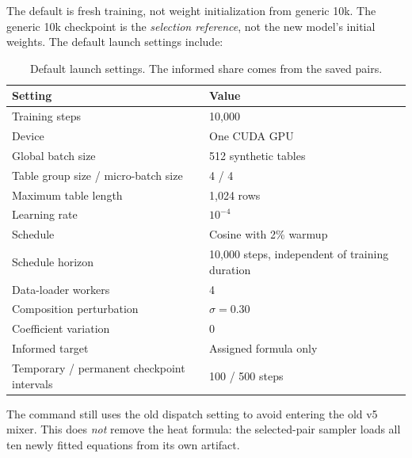 \documentclass[11pt]{article}
\newcommand{\code}[1]{\texttt{\detokenize{#1}}}
\begin{document}
The default is fresh training, not weight initialization from generic 10k.
The generic 10k checkpoint is the \emph{selection reference}, not the new model's
initial weights. The default launch settings include:
\begin{table}[htbp]
\centering
\begin{tabular}{ll}
\toprule
Setting & Value \\
\midrule
Training steps & 10,000 \\
Device & One CUDA GPU \\
Global batch size & 512 synthetic tables \\
Table group size / micro-batch size & 4 / 4 \\
Maximum table length & 1,024 rows \\
Learning rate & $10^{-4}$ \\
Schedule & Cosine with 2\% warmup \\
Schedule horizon & 10,000 steps, independent of training duration \\
Data-loader workers & 4 \\
Composition perturbation & $\sigma=0.30$ \\
Coefficient variation & 0 \\
Informed target & Assigned formula only \\
Temporary / permanent checkpoint intervals & 100 / 500 steps \\
\bottomrule
\end{tabular}
\caption{Default launch settings. The informed share comes from the saved pairs.}
\end{table}

The command still uses the old \code{v4} dispatch setting to avoid entering the
old v5 mixer. This does \emph{not} remove the heat formula: the selected-pair
sampler loads all ten newly fitted equations from its own artifact.
\end{document}
